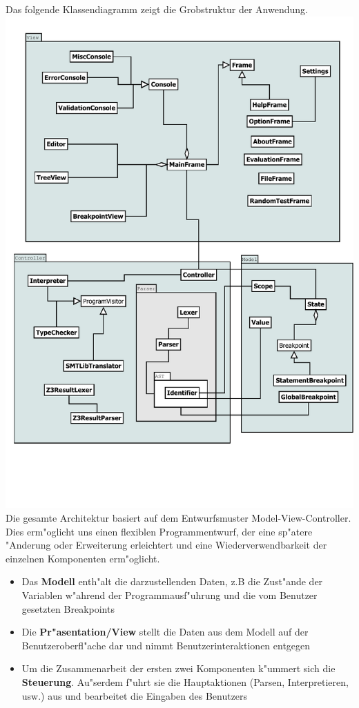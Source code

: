 \documentclass[10pt,a4paper,titlepage]{article}
\begin{document}
Das folgende Klassendiagramm zeigt die Grobstruktur der Anwendung. \\
\includegraphics[scale=0.8]{images/ClassOverview.pdf} \\
Die gesamte Architektur basiert auf dem Entwurfsmuster Model-View-Controller. Dies erm"oglicht uns einen flexiblen Programmentwurf, der eine sp"atere "Anderung oder Erweiterung erleichtert und eine Wiederverwendbarkeit der einzelnen Komponenten erm"oglicht.
\begin{itemize}
\item Das \textbf{Modell} enth"alt die darzustellenden Daten, z.B die Zust"ande der Variablen w"ahrend der Programmausf"uhrung und die vom Benutzer gesetzten Breakpoints
\item Die \textbf{Pr"asentation/View} stellt die Daten aus dem Modell auf der Benutzeroberfl"ache dar und nimmt Benutzerinteraktionen entgegen
\item Um die Zusammenarbeit der ersten zwei Komponenten k"ummert sich die \textbf{Steuerung}. Au"serdem f"uhrt sie die Hauptaktionen (Parsen, Interpretieren, usw.) aus und bearbeitet die Eingaben des Benutzers \\\\
\end{itemize}
\end{document}
